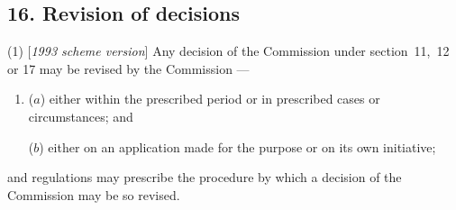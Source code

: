 \documentclass[12pt,a4paper]{article}
\begin{document}
%
%
%
%
%
%
%
%

\subsection{16. Revision of decisions}

(1) [\emph{1993 scheme version}] Any decision of the 
Commission  %
under section~11,~12 or 17 may be revised by the 
Commission%
—
\begin{enumerate}\item[]
($a$) either within the prescribed period or in prescribed cases or circumstances; and

($b$) either on an application made for the purpose or on 
its  %
own initiative;
\end{enumerate}
and regulations may prescribe the procedure by which a decision of the 
Commission  %
may be so revised.
\end{document}
